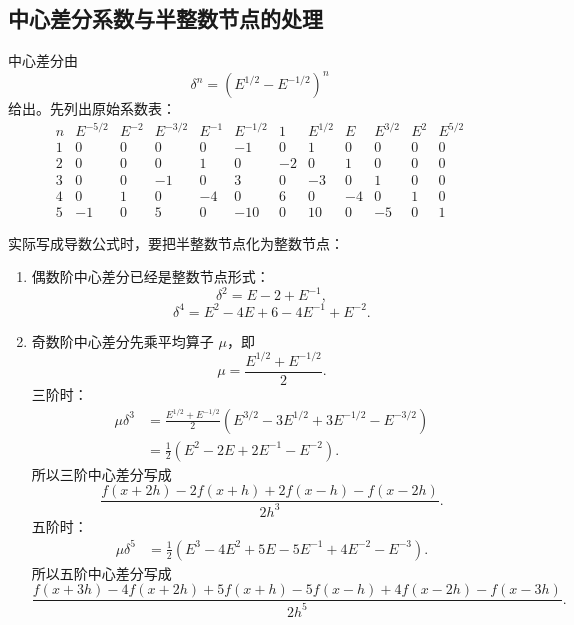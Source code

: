 \documentclass[12pt,a4paper]{ctexart}
\begin{document}
\subsection{中心差分系数与半整数节点的处理}
中心差分由
\[
  \delta^n=(E^{1/2}-E^{-1/2})^n
\]
给出。先列出原始系数表：
{\small
\[
\begin{array}{c|rrrrrrrrrrr}
 n&E^{-5/2}&E^{-2}&E^{-3/2}&E^{-1}&E^{-1/2}&1&E^{1/2}&E&E^{3/2}&E^2&E^{5/2}\\
\hline
1&0&0&0&0&-1&0&1&0&0&0&0\\
2&0&0&0&1&0&-2&0&1&0&0&0\\
3&0&0&-1&0&3&0&-3&0&1&0&0\\
4&0&1&0&-4&0&6&0&-4&0&1&0\\
5&-1&0&5&0&-10&0&10&0&-5&0&1
\end{array}
\]
}

实际写成导数公式时，要把半整数节点化为整数节点：

\begin{enumerate}[label=(\arabic*)]
\item 偶数阶中心差分已经是整数节点形式：
\[
  \delta^2=E-2+E^{-1},
\]
\[
  \delta^4=E^2-4E+6-4E^{-1}+E^{-2}.
\]

\item 奇数阶中心差分先乘平均算子 $\mu$，即
\[
  \mu=\frac{E^{1/2}+E^{-1/2}}{2}.
\]
三阶时：
\[
\begin{aligned}
\mu\delta^3
&=\frac{E^{1/2}+E^{-1/2}}{2}
  \left(E^{3/2}-3E^{1/2}+3E^{-1/2}-E^{-3/2}\right)\\
&=\frac12\left(E^2-2E+2E^{-1}-E^{-2}\right).
\end{aligned}
\]
所以三阶中心差分写成
\[
  \frac{f(x+2h)-2f(x+h)+2f(x-h)-f(x-2h)}{2h^3}.
\]
五阶时：
\[
\begin{aligned}
\mu\delta^5
&=\frac12\left(E^3-4E^2+5E-5E^{-1}+4E^{-2}-E^{-3}\right).
\end{aligned}
\]
所以五阶中心差分写成
\[
  \frac{f(x+3h)-4f(x+2h)+5f(x+h)-5f(x-h)+4f(x-2h)-f(x-3h)}{2h^5}.
\]
\end{enumerate}
\end{document}
